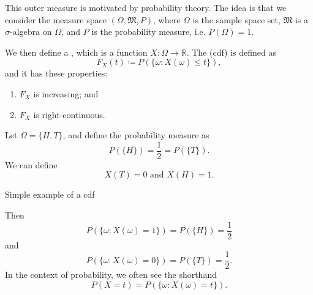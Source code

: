 \documentclass[notoc,notitlepage]{tufte-book}
\begin{document}
This outer measure is motivated by probability theory.
The idea is that we consider the measure space $(\Omega, \mathfrak{M}, P)$,
where $\Omega$ is the sample space set,
$\mathfrak{M}$ is a $\sigma$-algebra on $\Omega$,
and $P$ is the probability measure, i.e. $P(\Omega) = 1$.

We then define a ,
which is a function $X : \Omega \to \mathbb{R}$.
The  (cdf)
is defined as
\begin{equation*}
  F_X(t) \coloneqq P(\{ \omega : X(\omega) \leq t \}),
\end{equation*}
and it has these properties:
\begin{enumerate}
  \item $F_X$ is increasing; and
  \item $F_X$ is right-continuous.
\end{enumerate}

\begin{eg}
  Let $\Omega = \{ H, T \}$, and define the probability measure as
  \begin{equation*}
    P(\{ H \}) = \frac{1}{2} = P(\{ T \}).
  \end{equation*}
  We can define
  \begin{equation*}
    X(T) = 0 \text{ and } X(H) = 1.
  \end{equation*}
  \begin{marginfigure}
    \centering
    \caption{Simple example of a cdf}\label{fig:simple_example_of_a_cdf}
  \end{marginfigure}
  Then
  \begin{equation*}
    P(\{ \omega : X(\omega) = 1\}) = P(\{ H \}) = \frac{1}{2}
  \end{equation*}
  and
  \begin{equation*}
    P(\{ \omega : X(\omega) = 0 \}) = P(\{ T \}) = \frac{1}{2}.
  \end{equation*}
  In the context of probability, we often see the shorthand
  \begin{equation*}
    P(X = t) = P(\{ \omega : X(\omega) = t \}).
  \end{equation*}
\end{eg}
\end{document}
